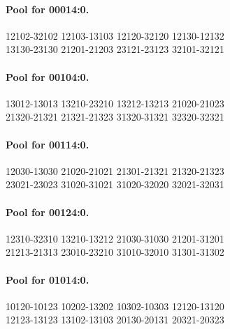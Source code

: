 \documentclass[11pt]{article}
\theoremstyle{remark}
\numberwithin{equation}{section}
\numberwithin{table}{section}
\begin{document}
\paragraph{Pool for 00014:0.}
\begingroup\footnotesize\ttfamily\begin{flushleft}
12102-32102 12103-13103 12120-32120 12130-12132\\
13130-23130 21201-21203 23121-23123 32101-32121\\
\end{flushleft}\endgroup
\paragraph{Pool for 00104:0.}
\begingroup\footnotesize\ttfamily\begin{flushleft}
13012-13013 13210-23210 13212-13213 21020-21023\\
21320-21321 21321-21323 31320-31321 32320-32321\\
\end{flushleft}\endgroup
\paragraph{Pool for 00114:0.}
\begingroup\footnotesize\ttfamily\begin{flushleft}
12030-13030 21020-21021 21301-21321 21320-21323\\
23021-23023 31020-31021 31020-32020 32021-32031\\
\end{flushleft}\endgroup
\paragraph{Pool for 00124:0.}
\begingroup\footnotesize\ttfamily\begin{flushleft}
12310-32310 13210-13212 21030-31030 21201-31201\\
21213-21313 23010-23210 31010-32010 31301-31302\\
\end{flushleft}\endgroup
\paragraph{Pool for 01014:0.}
\begingroup\footnotesize\ttfamily\begin{flushleft}
10120-10123 10202-13202 10302-10303 12120-13120\\
12123-13123 13102-13103 20130-20131 20321-20323\\
\end{flushleft}\endgroup
\end{document}
